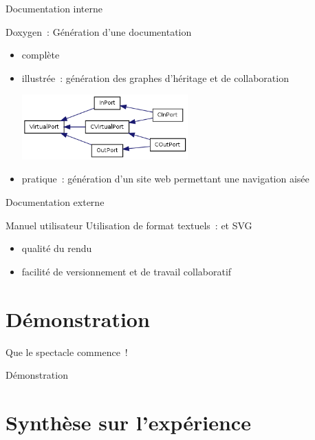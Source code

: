 \documentclass[frenchb]{beamer}
\begin{document}
\begin{frame}{Documentation interne}
    \begin{block}{Doxygen~: Génération d'une documentation}
            \begin{itemize}
                \item complète 
                \item illustrée~: génération des graphes d'héritage et de collaboration
                \begin{center}
                    \includegraphics[height=2.5cm]{../img/png/inheritVirtualPort}
                \end{center}
                \item pratique~: génération d'un site web permettant une navigation aisée
            \end{itemize}
     \end{block}
\end{frame}

\begin{frame}{Documentation externe}
     \begin{block}{Manuel utilisateur}
        Utilisation de format textuels~: \LaTeXe{} et SVG
        \begin{itemize}
            \item qualité du rendu
            \item facilité de versionnement et de travail collaboratif
        \end{itemize}
     \end{block}
\end{frame}

\section{Démonstration}

\begin{frame}{Que le spectacle commence~!}
    \begin{center}
        \Huge Démonstration
    \end{center}
\end{frame}

\section{Synthèse sur l’expérience}
\end{document}
